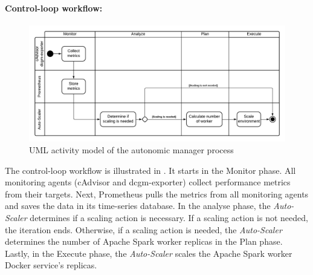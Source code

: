 \paragraph{Control-loop workflow:}
\begin{figure}[h]
\centering
\includegraphics[scale=0.50]{images/05_conceptual_design/autonomic_manager/autonomic_manager_workflow}
\caption{UML activity model of the autonomic manager process}
\label{fig:05_am_monitoring_loop_workflow}
\end{figure}
The control-loop workflow is illustrated in .
It starts in the Monitor phase. All monitoring agents (cAdvisor and dcgm-exporter) collect performance metrics from their targets. Next, Prometheus pulls the metrics from all monitoring agents and saves the data in its time-series database.
In the analyse phase, the \textit{Auto-Scaler} determines if a scaling action is necessary. If a scaling action is not needed, the iteration ends.
Otherwise, if a scaling action is needed, the \textit{Auto-Scaler} determines the number of Apache Spark worker replicas in the Plan phase.
Lastly, in the Execute phase, the \textit{Auto-Scaler} scales the Apache Spark worker Docker service's replicas.


